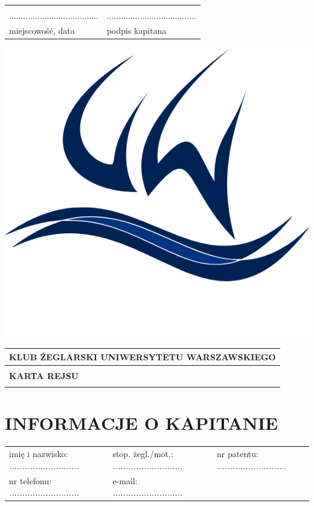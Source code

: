 \documentclass{article}
\begin{document}
\begin{tabularx}{\textwidth}{X X}
\\\\
...................................... & ......................................\\
miejscowość, data & podpis kapitana\\
\end{tabularx}
\newpage
\begin{minipage}{0.11\textwidth}
\includegraphics[width=\textwidth]{logo.png}
\end{minipage}
\begin{minipage}{0.89\textwidth}
\begin{tabularx}{\textwidth} { 
  | >{\centering\arraybackslash}X | }
 \hline
 \textbf{KLUB ŻEGLARSKI UNIWERSYTETU WARSZAWSKIEGO} \\
 \hline
 \\
 \textbf{\huge KARTA REJSU} \\
 \\
\hline
\end{tabularx}
\end{minipage}

\section*{INFORMACJE O KAPITANIE}
\begin{tabularx}{\textwidth}{X X X}
imię i nazwisko: \textit{...........................} & stop. żegl./mot.: \textit{...........................} & nr patentu: \textit{...........................} \\
nr telefonu: \textit{...........................} & e-mail: \textit{...........................} \\
\end{tabularx}
\end{document}

